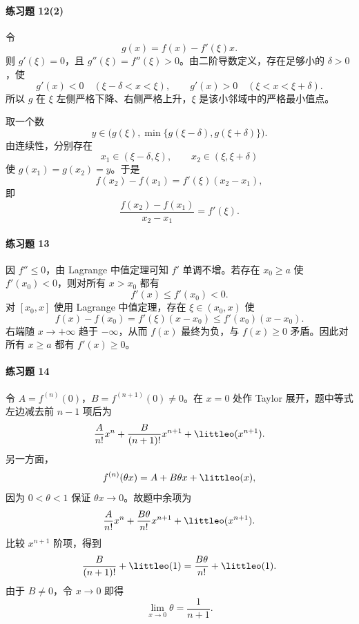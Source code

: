 \paragraph{练习题 12(2)}
\begin{xsolution}
令
\[
  g(x)=f(x)-f'(\xi)x.
\]
则 $g'(\xi)=0$，且 $g''(\xi)=f''(\xi)>0$。由二阶导数定义，存在足够小的 $\delta>0$，使
\[
  g'(x)<0\quad(\xi-\delta<x<\xi),
  \qquad
  g'(x)>0\quad(\xi<x<\xi+\delta).
\]
所以 $g$ 在 $\xi$ 左侧严格下降、右侧严格上升，$\xi$ 是该小邻域中的严格最小值点。

取一个数
\[
  y\in\bigl(g(\xi),\min\{g(\xi-\delta),g(\xi+\delta)\}\bigr).
\]
由连续性，分别存在
\[
  x_1\in(\xi-\delta,\xi),
  \qquad
  x_2\in(\xi,\xi+\delta)
\]
使 $g(x_1)=g(x_2)=y$。于是
\[
  f(x_2)-f(x_1)=f'(\xi)(x_2-x_1),
\]
即
\[
  \frac{f(x_2)-f(x_1)}{x_2-x_1}=f'(\xi).
\]
\end{xsolution}

\paragraph{练习题 13}
\begin{xsolution}
因 $f''\leqslant0$，由 Lagrange 中值定理可知 $f'$ 单调不增。若存在 $x_0\geqslant a$ 使 $f'(x_0)<0$，则对所有 $x>x_0$ 都有
\[
  f'(x)\leqslant f'(x_0)<0.
\]
对 $[x_0,x]$ 使用 Lagrange 中值定理，存在 $\xi\in(x_0,x)$ 使
\[
  f(x)-f(x_0)=f'(\xi)(x-x_0)
  \leqslant f'(x_0)(x-x_0).
\]
右端随 $x\to+\infty$ 趋于 $-\infty$，从而 $f(x)$ 最终为负，与 $f(x)\geqslant0$ 矛盾。因此对所有 $x\geqslant a$ 都有 $f'(x)\geqslant0$。
\end{xsolution}

\paragraph{练习题 14}
\begin{xsolution}
令 $A=f^{(n)}(0)$，$B=f^{(n+1)}(0)\neq0$。在 $x=0$ 处作 Taylor 展开，题中等式左边减去前 $n-1$ 项后为
\[
  \frac{A}{n!}x^n+\frac{B}{(n+1)!}x^{n+1}
  +\littleo(x^{n+1}).
\]
另一方面，
\[
  f^{(n)}(\theta x)=A+B\theta x+\littleo(x),
\]
因为 $0<\theta<1$ 保证 $\theta x\to0$。故题中余项为
\[
  \frac{A}{n!}x^n+\frac{B\theta}{n!}x^{n+1}
  +\littleo(x^{n+1}).
\]
比较 $x^{n+1}$ 阶项，得到
\[
  \frac{B}{(n+1)!}+\littleo(1)
  =\frac{B\theta}{n!}+\littleo(1).
\]
由于 $B\neq0$，令 $x\to0$ 即得
\[
  \lim_{x\to0}\theta=\frac1{n+1}.
\]
\end{xsolution}

